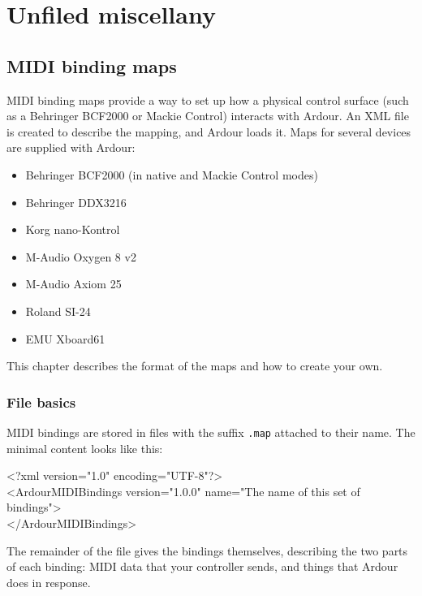 \documentclass[10pt,a4paper]{book}
\begin{document}
{%

\chapter{Unfiled miscellany}

\section{MIDI binding maps}

MIDI binding maps provide a way to set up how a physical control
surface (such as a Behringer BCF2000 or Mackie Control) interacts with
Ardour.  An XML file is created to describe the mapping, and Ardour
loads it.  Maps for several devices are supplied with Ardour:

\begin{itemize}
\item Behringer BCF2000 (in native and Mackie Control modes)
\item Behringer DDX3216
\item Korg nano-Kontrol
\item M-Audio Oxygen 8 v2
\item M-Audio Axiom 25
\item Roland SI-24
\item EMU Xboard61
\end{itemize}

This chapter describes the format of the maps and how to create your own.


\subsection{File basics}

MIDI bindings are stored in files with the suffix \texttt{.map}
attached to their name. The minimal content looks like this:

\begin{listing}
<?xml version="1.0" encoding="UTF-8"?>\\
<ArdourMIDIBindings version="1.0.0" name="The name of this set of bindings">\\
</ArdourMIDIBindings>\\
\end{listing}

The remainder of the file gives the bindings themselves, describing
the two parts of each binding: MIDI data that your controller sends,
and things that Ardour does in response.

}
\end{document}
